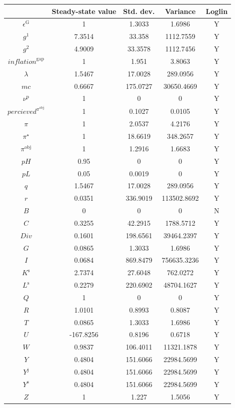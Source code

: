 \begin{tabular}{c|c|c|c|c|}
  & Steady-state value & Std. dev. & Variance & Loglin\\
\hline
$\epsilon^{\mathrm{G}}$ & 1 & 1.3033 & 1.6986 & Y    \\
$g^{\mathrm{1}}$ & 7.3514 & 33.358 & 1112.7559 & Y    \\
$g^{\mathrm{2}}$ & 4.9009 & 33.3578 & 1112.7456 & Y    \\
${i\!n\!f\!l\!a\!t\!i\!o\!n}^{\mathrm{gap}}$ & 1 & 1.951 & 3.8063 & Y    \\
$\lambda$ & 1.5467 & 17.0028 & 289.0956 & Y    \\
${m\!c}$ & 0.6667 & 175.0727 & 30650.4669 & Y    \\
$\nu^{\mathrm{p}}$ & 1 & 0 & 0 & Y    \\
${p\!e\!r\!c\!i\!e\!v\!e\!d}^{\pi^{\mathrm{obj}}}$ & 1 & 0.1027 & 0.0105 & Y    \\
$\pi$ & 1 & 2.0537 & 4.2176 & Y    \\
$\pi^{\star}$ & 1 & 18.6619 & 348.2657 & Y    \\
$\pi^{\mathrm{obj}}$ & 1 & 1.2916 & 1.6683 & Y    \\
${p\!H}$ & 0.95 & 0 & 0 & Y    \\
${p\!L}$ & 0.05 & 0.0019 & 0 & Y    \\
$q$ & 1.5467 & 17.0028 & 289.0956 & Y    \\
$r$ & 0.0351 & 336.9019 & 113502.8692 & Y    \\
$B$ & 0 & 0 & 0 & N    \\
$C$ & 0.3255 & 42.2915 & 1788.5712 & Y    \\
${D\!i\!v}$ & 0.1601 & 198.6561 & 39464.2397 & Y    \\
$G$ & 0.0865 & 1.3033 & 1.6986 & Y    \\
$I$ & 0.0684 & 869.8479 & 756635.3236 & Y    \\
$K^{\mathrm{s}}$ & 2.7374 & 27.6048 & 762.0272 & Y    \\
$L^{\mathrm{s}}$ & 0.2279 & 220.6902 & 48704.1627 & Y    \\
$Q$ & 1 & 0 & 0 & Y    \\
$R$ & 1.0101 & 0.8993 & 0.8087 & Y    \\
$T$ & 0.0865 & 1.3033 & 1.6986 & Y    \\
$U$ & -167.8256 & 0.8196 & 0.6718 & Y    \\
$W$ & 0.9837 & 106.4011 & 11321.1878 & Y    \\
$Y$ & 0.4804 & 151.6066 & 22984.5699 & Y    \\
$Y^{\mathrm{j}}$ & 0.4804 & 151.6066 & 22984.5699 & Y    \\
$Y^{\mathrm{s}}$ & 0.4804 & 151.6066 & 22984.5699 & Y    \\
$Z$ & 1 & 1.227 & 1.5056 & Y    \\
\hline
\end{tabular}


